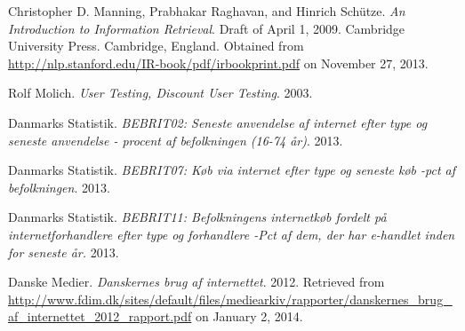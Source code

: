 \begin{thebibliography}{9} %


Christopher D. Manning, Prabhakar Raghavan, and Hinrich Sch\"utze. \emph{An
Introduction to Information Retrieval}. Draft of April 1, 2009. Cambridge
University Press. Cambridge, England.  Obtained from
\url{http://nlp.stanford.edu/IR-book/pdf/irbookprint.pdf} on November 27, 2013.


Rolf Molich. \emph{User Testing, Discount User Testing}. 2003.


Danmarks Statistik. \emph{BEBRIT02: Seneste anvendelse af internet efter type
og seneste anvendelse - procent af befolkningen (16-74 år)}. 2013.


Danmarks Statistik. \emph{BEBRIT07: Køb via internet efter type og seneste køb
-pct af befolkningen}. 2013.


Danmarks Statistik. \emph{BEBRIT11: Befolkningens internetkøb fordelt på
internetforhandlere efter type og forhandlere -Pct af dem, der har e-handlet
inden for seneste år.} 2013.


Danske Medier. \emph{Danskernes brug af internettet}. 2012. Retrieved from
\url{http://www.fdim.dk/sites/default/files/mediearkiv/rapporter/danskernes_brug_af_internettet_2012_rapport.pdf}
on January 2, 2014.

\end{thebibliography}

